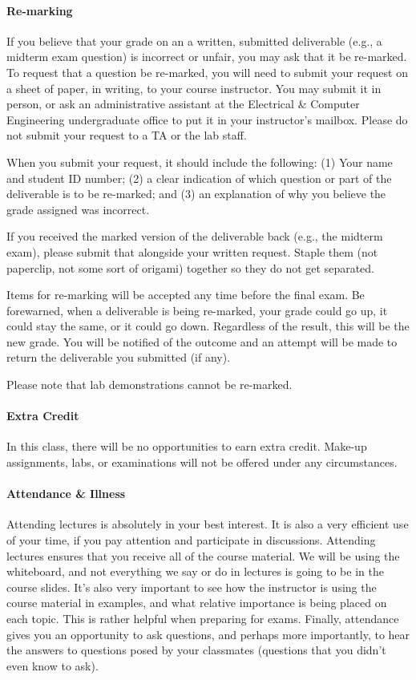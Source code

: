\documentclass[letterpaper,10pt]{article}
\begin{document}
\paragraph{Re-marking}

If you believe that your grade on an a written, submitted deliverable (e.g., a midterm exam question) is incorrect or unfair, you may ask that it be re-marked. To request that a question be re-marked, you will need to submit your request on a sheet of paper, in writing, to your course instructor. You may submit it in person, or ask an administrative assistant at the Electrical \& Computer Engineering undergraduate office to put it in your instructor's mailbox. Please do not submit your request to a TA or the lab staff. 

When you submit your request, it should include the following: (1) Your name and student ID number; (2) a clear indication of which question or part of the deliverable is to be re-marked; and (3) an explanation of why you believe the grade assigned was incorrect.

If you received the marked version of the deliverable back (e.g., the midterm exam), please submit that alongside your written request. Staple them (not paperclip, not some sort of origami) together so they do not get separated.

Items for re-marking will be accepted any time before the final exam. Be forewarned, when a deliverable is being re-marked, your grade could go up, it could stay the same, or it could go down. Regardless of the result, this will be the new grade. You will be notified of the outcome and an attempt will be made to return the deliverable you submitted (if any).

Please note that lab demonstrations cannot be re-marked.

\paragraph{Extra Credit}
In this class, there will be no opportunities to earn extra credit. Make-up assignments, labs, or examinations will not be offered under any circumstances.

\paragraph{Attendance \& Illness}

Attending lectures is absolutely in your best interest. It is also a very efficient use of your time, if you pay attention and participate in discussions. Attending lectures ensures that you receive all of the course material. We will be using the whiteboard, and not everything we say or do in lectures is going to be in the course slides. It's also very important to see how the instructor is using the course material in examples, and what relative importance is being placed on each topic. This is rather helpful when preparing for exams. Finally, attendance gives you an opportunity to ask questions, and perhaps more importantly, to hear the answers to questions posed by your classmates (questions that you didn't even know to ask).
\end{document}
